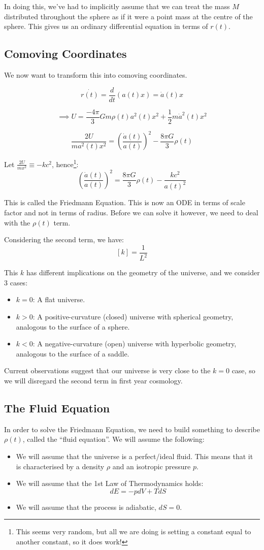 In doing this, we've had to implicitly assume that we can treat the mass $M$ distributed throughout the sphere as if it were a point mass at the centre of the sphere. This gives us an ordinary differential equation in terms of $r(t)$.

\subsection{Comoving Coordinates}
We now want to transform this into comoving coordinates.

\[
    \dot{r(t)} = \frac{d}{dt} \left(a(t) x\right) = \dot{a}(t) x
\]

\[
    \implies U = \frac{-4 \pi}{3} Gm \rho(t) a^2(t) x^2 + \frac{1}{2}m \dot{a}^2(t) x^2
\]

\[
    \frac{2 U}{ma^2(t) x^2} = \left(\frac{\dot{a}(t)}{a(t)}\right)^2 - \frac{8 \pi G}{3} \rho(t)
\]

Let $\frac{2U}{mx^2} \equiv - kc^2$, hence\footnote{This seems very random, but all we are doing is setting a constant equal to another constant, so it does work!}:
\[
    \boxed{\left(\frac{\dot{a}(t)}{a(t)}\right)^2 =  \frac{8 \pi G}{3} \rho(t) - \frac{kc^2}{a(t)^2}}
\]

This is called the Friedmann Equation. This is now an ODE in terms of scale factor and not in terms of radius. Before we can solve it however, we need to deal with the $\rho(t)$ term.

Considering the second term, we have:
\[
    [k] = \frac{1}{L^2}
\]

This $k$ has different implications on the geometry of the universe, and we consider 3 cases:
\begin{itemize}
    \item $k=0$: A flat universe.
    \item $k>0$: A positive-curvature (closed) universe with spherical geometry, analogous to the surface of a sphere.
    \item $k<0$: A negative-curvature (open) universe with hyperbolic geometry, analogous to the surface of a saddle.
\end{itemize}

Current observations suggest that our universe is very close to the $k=0$ case, so we will disregard the second term in first year cosmology.

\subsection{The Fluid Equation}
In order to solve the Friedmann Equation, we need to build something to describe $\rho (t)$, called the ``fluid equation''. We will assume the following:
\begin{itemize}
    \item We will assume that the universe is a perfect/ideal fluid. This means that it is characterised by a density $\rho$ and an isotropic pressure $p$.
    \item We will assume that the 1st Law of Thermodynamics holds:
    \[
        dE = - p dV + TdS
    \]
    \item We will assume that the process is adiabatic, $dS = 0$.
\end{itemize}

